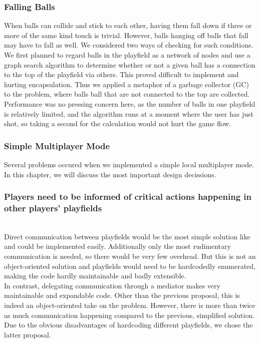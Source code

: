 \subsubsection{Falling Balls}
\label{sec:garbage}
When balls can collide and stick to each other, having them fall down 
if three or more of the same kind touch is trivial. However, balls 
hanging off balls that fall may have to fall as well. We considered 
two ways of checking for such conditions. We first planned to regard balls in the 
playfield as a network of nodes and use a graph search algorithm to determine 
whether or not a given ball has a connection to the top of the playfield via 
others. This proved difficult to implement and hurting encapsulation. Thus 
we applied a metaphor of a garbage collector (GC) to the problem, where balls
ball that are not connected to the top are collected. Performance was no pressing 
concern here, as the number of balls in one playfield is relatively limited, 
and the algorithm runs at a moment where the user has just shot, so taking a second 
for the calculation would not hurt the game flow.

\subsubsection{Simple Multiplayer Mode}
Several problems occured when we implemented a simple local multiplayer mode. In this chapter, 
we will discuss the most important design decissions.

%
  \subsubsection{Players need to be informed of critical actions happening in other players' playfields}
  ~\\
    Direct communication between playfields would be the most simple solution like and 
    could be implemented easily. Additionally only the most rudimentary communication is needed,
    so there would be very few overhead. But this is not an object-oriented solution and playfields 
    would need to be hardcodedly enumerated, making the code hardly maintainable and badly extensible.\\
    In contrast, delegating communication through a mediator makes very maintainable and
    expandable code. Other than the previous proposal, this is indeed an object-oriented 
    take on the problem. However, there is more than twice as much communication happening 
    compared to the previous, simplified solution. Due to the obvious disadvantages of 
    hardcoding different playfields, we chose the latter proposal.

